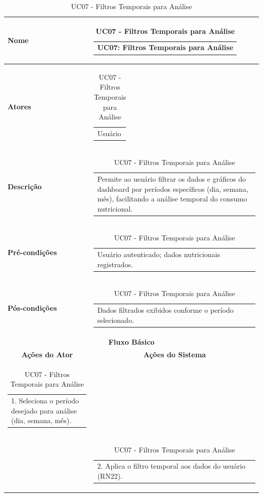 \begin{longtable}[c]{|p{}|p{}|}
\caption{UC07 - Filtros Temporais para Análise}
\label{tab:uc07}\\
\hline
\multicolumn{1}{|p{0.48\textwidth}|}{\textbf{Nome}} &
  \begin{tabular}[c]{@{}p{}@{}}UC07: Filtros Temporais para Análise\end{tabular} \\ \hline
\endfirsthead
\endhead

\multicolumn{1}{|p{0.48\textwidth}|}{\textbf{Atores}} &
  \begin{tabular}[c]{@{}p{}@{}}Usuário\end{tabular} \\ \hline
\multicolumn{1}{|p{0.48\textwidth}|}{\textbf{Descrição}} &
  \begin{tabular}[c]{@{}p{}@{}}Permite ao usuário filtrar os dados e gráficos do dashboard por períodos específicos (dia, semana, mês), facilitando a análise temporal do consumo nutricional.\end{tabular} \\ \hline
\multicolumn{1}{|p{0.48\textwidth}|}{\textbf{Pré-condições}} &
  \begin{tabular}[c]{@{}p{}@{}}Usuário autenticado; dados nutricionais registrados.\end{tabular} \\ \hline
\multicolumn{1}{|p{0.48\textwidth}|}{\textbf{Pós-condições}} &
  \begin{tabular}[c]{@{}p{}@{}}Dados filtrados exibidos conforme o período selecionado.\end{tabular} \\ \hline
\multicolumn{2}{|c|}{\textbf{Fluxo Básico}} \\ \hline
\multicolumn{1}{|c|}{\textbf{Ações do Ator}} &
  \multicolumn{1}{c|}{\textbf{Ações do Sistema}} \\ \hline
\multicolumn{1}{|p{0.48\textwidth}|}{\begin{tabular}[c]{@{}p{}@{}}1. Seleciona o período desejado para análise (dia, semana, mês).\end{tabular}} & \\ \hline
\multicolumn{1}{|p{0.48\textwidth}|}{} &
  \begin{tabular}[c]{@{}p{}@{}}2. Aplica o filtro temporal aos dados do usuário (RN22).\end{tabular} \\ \hline

\end{longtable}
